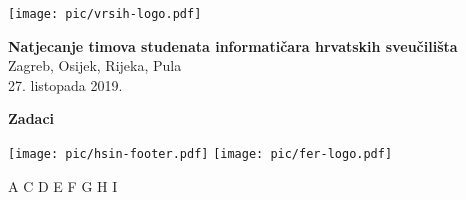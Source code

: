 \documentclass[a4paper]{article}
\begin{document}
\thispagestyle{empty}
\begin{center}
  \texttt{[image: pic/vrsih-logo.pdf]}
\end{center}
\vspace{1cm}
\begin{center}
  {\Large\textbf{\textsf{Natjecanje timova studenata informatičara hrvatskih sveučilišta}}} \\
  \vspace{.5cm}
  {\large{\textsf{Zagreb, Osijek, Rijeka, Pula}}} \\
  \vspace{.3cm}
  \textsf{27. listopada 2019.}
\end{center}
\vspace{2cm}
\begin{center}
  {\large \textbf{Zadaci}}
  
  \begin{minipage}{.5\textwidth}
    \renewcommand\contentsname{}
    \tableofcontents
  \end{minipage}
\end{center}
\vspace{5cm}
\begin{center}
  \texttt{[image: pic/hsin-footer.pdf]}
  \hspace{3cm}
  \texttt{[image: pic/fer-logo.pdf]}
\end{center}
\vspace{\fill}
\clearpage
\setcounter{page}{1}
{A}
{C}
{D}
{E}
{F}
{G}
{H}
{I}
\end{document}

